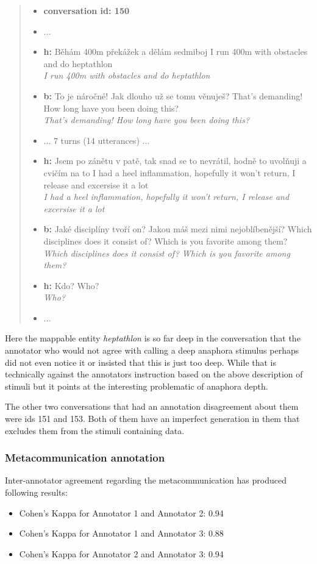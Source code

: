 \documentclass[12pt]{report}
\newcommand{\utterance}[3]{%
    \textbf{#1} #2%
    \ifx\relax#3\relax%
    \else \\ \textit{#3}%
    \fi%
}
\begin{document}
{\begin{quote}
\begin{itemize}[label={}, leftmargin=0pt, itemsep=0.5em]
\item \textbf{conversation id: 150}
\item ...
\item \utterance{h:}{Běhám 400m překážek a dělám sedmiboj}{I run 400m with obstacles and do heptathlon}
\item \utterance{b:}{To je náročné! Jak dlouho už se tomu věnuješ?}{That's demanding! How long have you been doing this?}
\item ... 7 turns (14 utterances) ...
\item \utterance{h:}{Jsem po zánětu v patě, tak snad se to nevrátil, hodně to uvolňuji a cvičím na to}{I had a heel inflammation, hopefully it won't return, I release and excersise it a lot}
\item \utterance{b:}{Jaké disciplíny tvoří on? Jakou máš mezi nimi nejoblíbenější?}{Which disciplines does it consist of? Which is you favorite among them?}
\item \utterance{h:}{Kdo?}{Who?}
\item ...
\end{itemize}
\end{quote}

Here the mappable entity \textit{heptathlon} is so far deep in the conversation that
the annotator who would not agree with calling a deep anaphora stimulus
perhaps did not even notice it or insisted that this is just too deep.
While that is technically against the annotators instruction based on the above description of stimuli
but it points at the interesting problematic of anaphora depth.

The other two conversations that had an annotation disagreement about them were ids 151 and 153.
Both of them have an imperfect generation in them that excludes them from the stimuli containing data.

\subsubsection{Metacommunication annotation}

Inter-annotator agreement regarding the metacommunication has produced following results:

\begin{itemize}[label={}]
\item Cohen's Kappa for Annotator 1 and Annotator 2: 0.94
\item Cohen's Kappa for Annotator 1 and Annotator 3: 0.88
\item Cohen's Kappa for Annotator 2 and Annotator 3: 0.94
\end{itemize}

}
\end{document}

